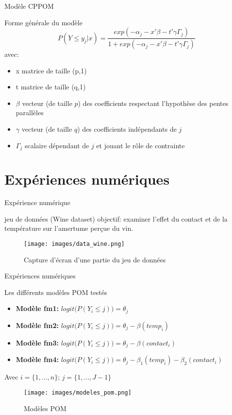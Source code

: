 \documentclass[11pt]{beamer}
\begin{document}
	\begin{frame}{Modèle CPPOM}
		\scriptsize
		\begin{block}{Forme générale du modèle}
			\[
			P(Y \leq y_j | x) = \frac{exp(- \alpha_j - x' \beta - t' \gamma \Gamma_j)}{1 + exp(- \alpha_j - x' \beta - t' \gamma \Gamma_j)}
			\]
			avec:
			\begin{itemize}
				\item x matrice de taille (p,1)
				\item t matrice de taille (q,1)
				\item $\beta$ vecteur (de taille $p$) des coefficients respectant l'hypothèse des pentes parallèles
				\item $\gamma$ vecteur (de taille $q$) des coefficients indépendants de $j$
				\item $\Gamma_j$ scalaire dépendant de $j$ et jouant le rôle de contrainte
			\end{itemize}
		\end{block}
	\end{frame}
	
	\section{Expériences numériques}
	\begin{frame}{Expérience numérique}
		\begin{block}{jeu de données (Wine dataset)}
			objectif: examiner l'effet du contact et de la température sur l'amertume perçue du vin.
		\end{block}
		\begin{figure}[H]
			\centering
			\texttt{[image: images/data\_wine.png]}
			\caption{Capture d'écran d'une partie du jeu de données}
		\end{figure}
	\end{frame}
	
	\begin{frame}{Expériences numériques}
		\scriptsize
		\begin{block}{Les différents modèles POM testés}
			\begin{itemize}
				\item \textbf{Modèle fm1:} $logit\big( P(Y_i \leq j) \big) = \theta_j$ \\
				\item \textbf{Modèle fm2:} $logit\big( P(Y_i \leq j) \big) = \theta_j - \beta(temp_i)$ \\
				\item \textbf{Modèle fm3:} $logit\big( P(Y_i \leq j) \big) = \theta_j - \beta(contact_i)$ \\
				\item \textbf{Modèle fm4:} $logit\big( P(Y_i \leq j) \big) = \theta_j - \beta_1(temp_i) - \beta_2(contact_i)$
			\end{itemize}
			Avec $i = \{1, \dots ,n\}$; $j = \{1, \dots ,J-1\}$
			\begin{figure}[H]
				\centering
				\texttt{[image: images/modeles\_pom.png]}
				\caption{Modèles POM}
			\end{figure}
		\end{block}
	\end{frame}
	
\end{document}
